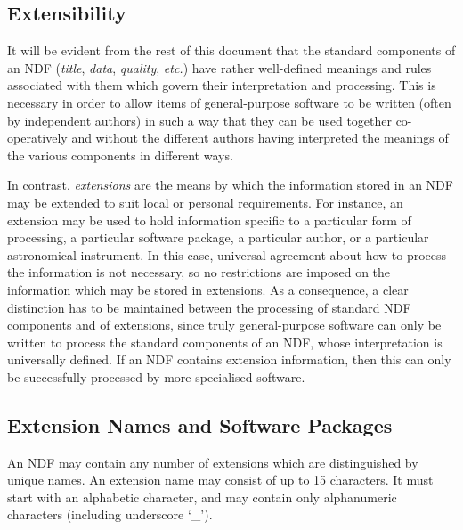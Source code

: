 \documentclass[twoside,11pt]{article}
\newcommand{\xlabel}[1]{}
\newcommand{\st}[1]{{\em{#1}}}
\begin{document}
\subsection{\xlabel{extensibility}Extensibility}

It will be evident from the rest of this document that the standard components
of an NDF (\st{title}, \st{data}, \st{quality}, \st{etc.}) have rather
well-defined meanings and rules associated with them which govern their
interpretation and processing. 
This is necessary in order to allow items of general-purpose software to be
written (often by independent authors) in such a way that they can be used
together co-operatively and without the different authors having interpreted
the meanings of the various components in different ways. 

In contrast, \st{extensions\/} are the means by which the information stored
in an NDF may be extended to suit local or personal requirements.
For instance, an extension may be used to hold information specific to a
particular form of processing, a particular software package, a particular
author, or a particular astronomical instrument. 
In this case, universal agreement about how to process the information is
not necessary, so no restrictions are imposed on the information which may
be stored in extensions. 
As a consequence, a clear distinction has to be maintained between the
processing of standard NDF components and of extensions, since truly
general-purpose software can only be written to process the standard
components of an NDF, whose interpretation is universally defined. 
If an NDF contains extension information, then this can only be successfully
processed by more specialised software. 

\subsection{\xlabel{extension_names_and_software_packages}Extension Names and Software Packages}

An NDF may contain any number of extensions which are distinguished
by unique names.
An extension name may consist of up to 15 characters.
It must start with an alphabetic character, and may contain only
alphanumeric characters (including underscore `\_'). 
\end{document}
